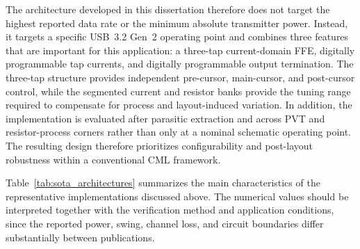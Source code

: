 The architecture developed in this dissertation therefore does not target the highest reported data rate or the minimum absolute transmitter power. Instead, it targets a specific \ac{USB}~3.2 Gen~2 operating point and combines three features that are important for this application: a three-tap current-domain \ac{FFE}, digitally programmable tap currents, and digitally programmable output termination. The three-tap structure provides independent pre-cursor, main-cursor, and post-cursor control, while the segmented current and resistor banks provide the tuning range required to compensate for process and layout-induced variation. In addition, the implementation is evaluated after parasitic extraction and across \ac{PVT} and resistor-process corners rather than only at a nominal schematic operating point. The resulting design therefore prioritizes configurability and post-layout robustness within a conventional \ac{CML} framework.

Table~\ref{tab:sota_architectures} summarizes the main characteristics of the representative implementations discussed above. The numerical values should be interpreted together with the verification method and application conditions, since the reported power, swing, channel loss, and circuit boundaries differ substantially between publications.

